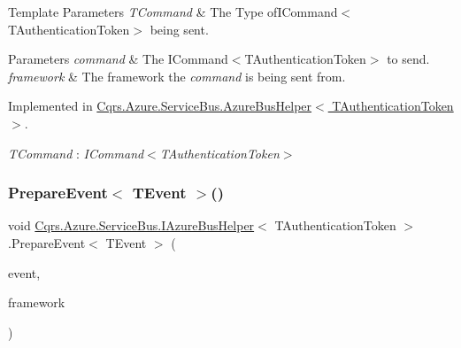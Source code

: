 \begin{DoxyTemplParams}{Template Parameters}
{\em T\+Command} & The Type ofI\+Command$<$\+T\+Authentication\+Token$>$ being sent.\\
\hline
\end{DoxyTemplParams}

\begin{DoxyParams}{Parameters}
{\em command} & The I\+Command$<$\+T\+Authentication\+Token$>$ to send.\\
\hline
{\em framework} & The framework the {\itshape command}  is being sent from.\\
\hline
\end{DoxyParams}


Implemented in \hyperlink{classCqrs_1_1Azure_1_1ServiceBus_1_1AzureBusHelper_abdcc74e09f97a259f16d04e2af454002_abdcc74e09f97a259f16d04e2af454002}{Cqrs.\+Azure.\+Service\+Bus.\+Azure\+Bus\+Helper$<$ T\+Authentication\+Token $>$}.

\begin{Desc}
\item[Type Constraints]\begin{description}
\item[{\em T\+Command} : {\em I\+Command$<$T\+Authentication\+Token$>$}]\end{description}
\end{Desc}
\mbox{\label{interfaceCqrs_1_1Azure_1_1ServiceBus_1_1IAzureBusHelper_ab7d1fa5162adc0f01edcf9039bb43c2c_ab7d1fa5162adc0f01edcf9039bb43c2c}} 
\subsubsection{\texorpdfstring{Prepare\+Event$<$ T\+Event $>$()}{PrepareEvent< TEvent >()}}
{\footnotesize\ttfamily void \hyperlink{interfaceCqrs_1_1Azure_1_1ServiceBus_1_1IAzureBusHelper}{Cqrs.\+Azure.\+Service\+Bus.\+I\+Azure\+Bus\+Helper}$<$ T\+Authentication\+Token $>$.Prepare\+Event$<$ T\+Event $>$ (\begin{DoxyParamCaption}\item[{T\+Event @}]{event,  }\item[{string}]{framework }\end{DoxyParamCaption})}




